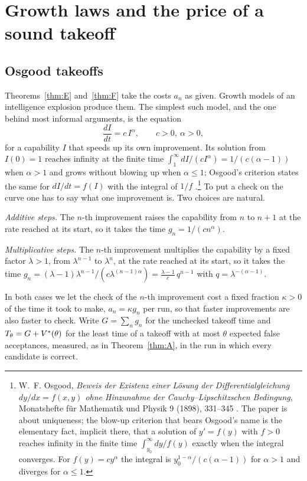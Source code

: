 \section{Growth laws and the price of a sound takeoff}\label{sec:scaling}

\subsection{Osgood takeoffs}

Theorems~\ref{thm:E} and~\ref{thm:F} take the costs $a_{n}$ as given. Growth models of an intelligence explosion produce them. The simplest such model, and the one behind most informal arguments, is the equation
\[
\frac{dI}{dt}=c\,I^{\alpha},\qquad c>0,\ \alpha>0,
\]
for a capability $I$ that speeds up its own improvement. Its solution from $I(0)=1$ reaches infinity at the finite time $\int_{1}^{\infty}dI/(cI^{\alpha})=1/(c(\alpha-1))$ when $\alpha>1$ and grows without blowing up when $\alpha\le1$; Osgood's criterion states the same for $dI/dt=f(I)$ with the integral of $1/f$ \cite{Osg98}.\footnote{W.~F. Osgood, \emph{Beweis der Existenz einer L\"osung der Differentialgleichung $dy/dx=f(x,y)$ ohne Hinzunahme der Cauchy--Lipschitzschen Bedingung}, Monatshefte f\"ur Mathematik und Physik 9 (1898), 331--345 \cite{Osg98}. The paper is about uniqueness; the blow-up criterion that bears Osgood's name is the elementary fact, implicit there, that a solution of $y'=f(y)$ with $f>0$ reaches infinity in the finite time $\int_{y_{0}}^{\infty}dy/f(y)$ exactly when the integral converges. For $f(y)=cy^{\alpha}$ the integral is $y_{0}^{1-\alpha}/(c(\alpha-1))$ for $\alpha>1$ and diverges for $\alpha\le1$.} To put a check on the curve one has to say what one improvement is. Two choices are natural.

\emph{Additive steps.} The $n$-th improvement raises the capability from $n$ to $n+1$ at the rate reached at its start, so it takes the time $g_{n}=1/(cn^{\alpha})$.

\emph{Multiplicative steps.} The $n$-th improvement multiplies the capability by a fixed factor $\lambda>1$, from $\lambda^{n-1}$ to $\lambda^{n}$, at the rate reached at its start, so it takes the time $g_{n}=(\lambda-1)\lambda^{n-1}/(c\lambda^{(n-1)\alpha})=\frac{\lambda-1}{c}\,q^{n-1}$ with $q=\lambda^{-(\alpha-1)}$.

In both cases we let the check of the $n$-th improvement cost a fixed fraction $\kappa>0$ of the time it took to make, $a_{n}=\kappa g_{n}$ per run, so that faster improvements are also faster to check. Write $G=\sum_{n}g_{n}$ for the unchecked takeoff time and $T_{\theta}=G+V^{*}(\theta)$ for the least time of a takeoff with at most $\theta$ expected false acceptances, measured, as in Theorem~\ref{thm:A}, in the run in which every candidate is correct.

